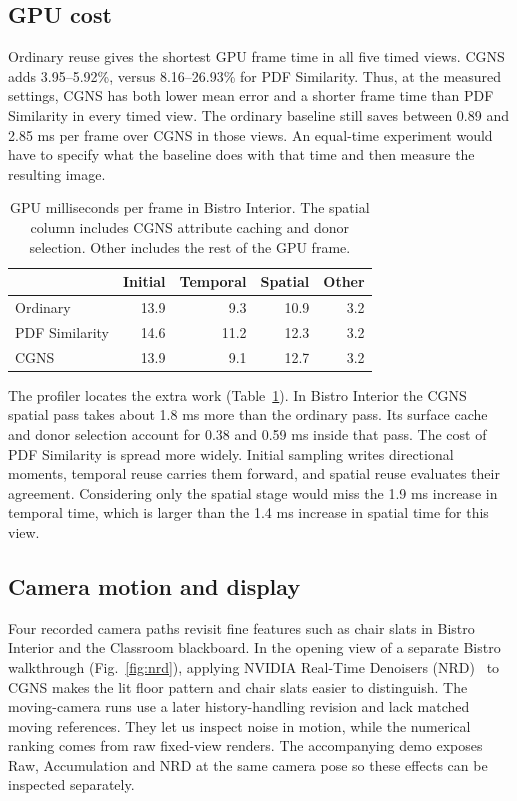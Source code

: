\documentclass[a4paper,twocolumn]{article}
\begin{document}
\subsection{GPU cost}
Ordinary reuse gives the shortest GPU frame time in all five timed views. CGNS adds 3.95--5.92\%, versus 8.16--26.93\% for PDF Similarity. Thus, at the measured settings, CGNS has both lower mean error and a shorter frame time than PDF Similarity in every timed view. The ordinary baseline still saves between 0.89 and 2.85 ms per frame over CGNS in those views. An equal-time experiment would have to specify what the baseline does with that time and then measure the resulting image.

\begin{table}[tb]
\centering
\caption{GPU milliseconds per frame in Bistro Interior. The spatial column includes CGNS attribute caching and donor selection. Other includes the rest of the GPU frame.}
\label{tab:stage}
\small
\begin{tabular}{@{}lrrrr@{}}
\toprule
 & Initial & Temporal & Spatial & Other\\
\midrule
Ordinary & 13.9 & 9.3 & 10.9 & 3.2\\
PDF Similarity & 14.6 & 11.2 & 12.3 & 3.2\\
CGNS & 13.9 & 9.1 & 12.7 & 3.2\\
\bottomrule
\end{tabular}
\end{table}
The profiler locates the extra work (Table~\ref{tab:stage}). In Bistro Interior the CGNS spatial pass takes about 1.8 ms more than the ordinary pass. Its surface cache and donor selection account for 0.38 and 0.59 ms inside that pass. The cost of PDF Similarity is spread more widely. Initial sampling writes directional moments, temporal reuse carries them forward, and spatial reuse evaluates their agreement. Considering only the spatial stage would miss the 1.9 ms increase in temporal time, which is larger than the 1.4 ms increase in spatial time for this view.

\subsection{Camera motion and display}
Four recorded camera paths revisit fine features such as chair slats in Bistro Interior and the Classroom blackboard. In the opening view of a separate Bistro walkthrough (Fig.~\ref{fig:nrd}), applying NVIDIA Real-Time Denoisers (NRD)~\cite{nrd} to CGNS makes the lit floor pattern and chair slats easier to distinguish. The moving-camera runs use a later history-handling revision and lack matched moving references. They let us inspect noise in motion, while the numerical ranking comes from raw fixed-view renders. The accompanying demo exposes Raw, Accumulation and NRD at the same camera pose so these effects can be inspected separately.
\end{document}
